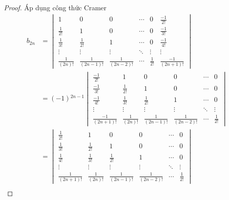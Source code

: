 \begin{proof}
    Áp dụng công thức Cramer
    \begingroup{}
    \allowdisplaybreaks{}
    \begin{align*}
        b_{2n} & =
        \begin{vmatrix}
            1               & 0                 & 0                 & \cdots & 0            & \frac{-1}{2!}      \\
            \frac{1}{2!}    & 1                 & 0                 & \cdots & 0            & \frac{-1}{3!}      \\
            \frac{1}{3!}    & \frac{1}{2!}      & 1                 & \cdots & 0            & \frac{-1}{4!}      \\
            \vdots          & \vdots            & \vdots            & \ddots & \vdots       & \vdots             \\
            \frac{1}{(2n)!} & \frac{1}{(2n-1)!} & \frac{1}{(2n-2)!} & \cdots & \frac{1}{2!} & \frac{-1}{(2n+1)!}
        \end{vmatrix} \\
               & = (-1){}^{2n-1}
        \begin{vmatrix}
            \frac{-1}{2!}      & 1               & 0                 & 0                 & \cdots & 0            \\
            \frac{-1}{3!}      & \frac{1}{2!}    & 1                 & 0                 & \cdots & 0            \\
            \frac{-1}{4!}      & \frac{1}{3!}    & \frac{1}{2!}      & 1                 & \cdots & 0            \\
            \vdots             & \vdots          & \vdots            & \vdots            & \ddots & \vdots       \\
            \frac{-1}{(2n+1)!} & \frac{1}{(2n)!} & \frac{1}{(2n-1)!} & \frac{1}{(2n-2)!} & \cdots & \frac{1}{2!}
        \end{vmatrix} \\
               & =
        \begin{vmatrix}
            \frac{1}{2!}      & 1               & 0                 & 0                 & \cdots & 0            \\
            \frac{1}{3!}      & \frac{1}{2!}    & 1                 & 0                 & \cdots & 0            \\
            \frac{1}{4!}      & \frac{1}{3!}    & \frac{1}{2!}      & 1                 & \cdots & 0            \\
            \vdots            & \vdots          & \vdots            & \vdots            & \ddots & \vdots       \\
            \frac{1}{(2n+1)!} & \frac{1}{(2n)!} & \frac{1}{(2n-1)!} & \frac{1}{(2n-2)!} & \cdots & \frac{1}{2!}
        \end{vmatrix}  \\
    \end{align*}
    \endgroup{}
    

\end{proof}

